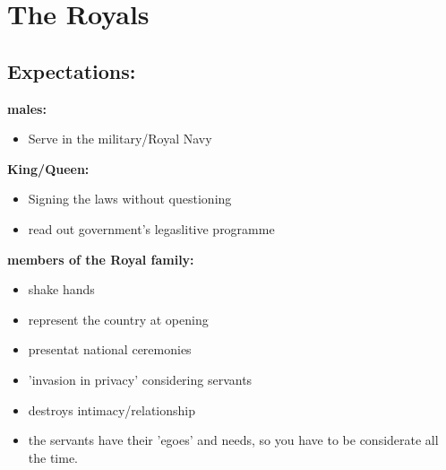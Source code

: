 \documentclass{article}
\begin{document}
\section*{The Royals}

\subsection*{Expectations:}

\noindent\textbf{males:}
\begin{itemize}
\item Serve in the military/Royal Navy
\end{itemize}


\noindent\textbf{King/Queen:}
\begin{itemize}
\item Signing the laws without questioning
\item read out government's legaslitive programme
\end{itemize}


\noindent\textbf{members of the Royal family:}
\begin{itemize}
\item shake hands
\item represent the country at opening
\item presentat national ceremonies
\item 'invasion in privacy' considering servants
\item destroys intimacy/relationship
\item the servants have their 'egoes' and needs, so you have to be considerate all the time.
\end{itemize}
\end{document}
